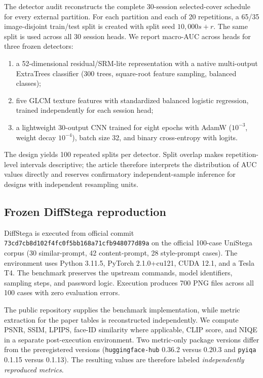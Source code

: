 The detector audit reconstructs the complete 30-session selected-cover schedule for every external partition. For each partition and each of 20 repetitions, a 65/35 image-disjoint train/test split is created with split seed $10{,}000s+r$. The same split is used across all 30 session heads. We report macro-AUC across heads for three frozen detectors:

\begin{enumerate}
\item a 52-dimensional residual/SRM-lite representation with a native multi-output ExtraTrees classifier (300 trees, square-root feature sampling, balanced classes);
\item five GLCM texture features with standardized balanced logistic regression, trained independently for each session head;
\item a lightweight 30-output CNN trained for eight epochs with AdamW ($10^{-3}$, weight decay $10^{-4}$), batch size 32, and binary cross-entropy with logits.
\end{enumerate}

The design yields 100 repeated splits per detector. Split overlap makes repetition-level intervals descriptive; the article therefore interprets the distribution of AUC values directly and reserves confirmatory independent-sample inference for designs with independent resampling units.

\subsection{Frozen DiffStega reproduction}

DiffStega \cite{yang2024diffstega} is executed from official commit \texttt{73cd7cb8d102f4fc0f5bb168a71cfb948077d89a} on the official 100-case UniStega corpus (30 similar-prompt, 42 content-prompt, 28 style-prompt cases). The environment uses Python 3.11.5, PyTorch 2.1.0+cu121, CUDA 12.1, and a Tesla T4. The benchmark preserves the upstream commands, model identifiers, sampling steps, and password logic. Execution produces 700 PNG files across all 100 cases with zero evaluation errors.

The public repository supplies the benchmark implementation, while metric extraction for the paper tables is reconstructed independently. We compute PSNR, SSIM, LPIPS, face-ID similarity where applicable, CLIP score, and NIQE in a separate post-execution environment. Two metric-only package versions differ from the preregistered versions (\texttt{huggingface-hub} 0.36.2 versus 0.20.3 and \texttt{pyiqa} 0.1.15 versus 0.1.13). The resulting values are therefore labeled \emph{independently reproduced metrics}.

